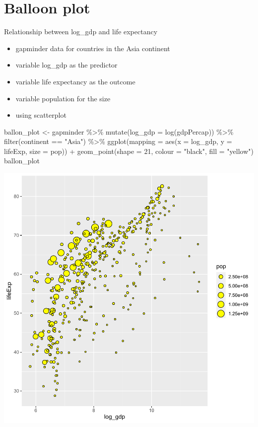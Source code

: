 \documentclass[
]{book}
\makeatletter
\newenvironment{Shaded}{\begin{snugshade}}{\end{snugshade}}
\newcommand{\AttributeTok}[1]{\textcolor[rgb]{0.61,0.61,0.61}{#1}}
\newcommand{\DecValTok}[1]{\textcolor[rgb]{0.06,0.06,0.06}{#1}}
\newcommand{\FunctionTok}[1]{\textcolor[rgb]{0,0,0}{#1}}
\newcommand{\NormalTok}[1]{#1}
\newcommand{\OtherTok}[1]{\textcolor[rgb]{0.37,0.37,0.37}{#1}}
\newcommand{\SpecialCharTok}[1]{\textcolor[rgb]{0,0,0}{#1}}
\newcommand{\StringTok}[1]{\textcolor[rgb]{0.5,0.5,0.5}{#1}}
\providecommand{\tightlist}{%
  \setlength{\itemsep}{0pt}\setlength{\parskip}{0pt}}
\newenvironment{kframe}{%
\medskip{}
\setlength{\fboxsep}{.8em}
 \def\at@end@of@kframe{}%
 \ifinner\ifhmode%
  \def\at@end@of@kframe{\end{minipage}}%
  \begin{minipage}{\columnwidth}%
 \fi\fi%
 \def\FrameCommand##1{\hskip\@totalleftmargin \hskip-\fboxsep
 \colorbox{shadecolor}{##1}\hskip-\fboxsep
     \hskip-\linewidth \hskip-\@totalleftmargin \hskip\columnwidth}%
 \MakeFramed {\advance\hsize-\width
   \@totalleftmargin\z@ \linewidth\hsize
   \@setminipage}}%
 {\par\unskip\endMakeFramed%
 \at@end@of@kframe}
\renewenvironment{Shaded}{\begin{kframe}}{\end{kframe}}
\makeatother
\begin{document}
\hypertarget{balloon-plot}{%
\section{Balloon plot}\label{balloon-plot}}

Relationship between log\_gdp and life expectancy

\begin{itemize}
\tightlist
\item
  gapminder data for countries in the Asia continent
\item
  variable log\_gdp as the predictor
\item
  variable life expectancy as the outcome
\item
  variable population for the size
\item
  using scatterplot
\end{itemize}

\begin{Shaded}
\begin{Highlighting}[]
\NormalTok{ballon\_plot }\OtherTok{\textless{}{-}}\NormalTok{ gapminder }\SpecialCharTok{\%\textgreater{}\%} \FunctionTok{mutate}\NormalTok{(}\AttributeTok{log\_gdp =} \FunctionTok{log}\NormalTok{(gdpPercap)) }\SpecialCharTok{\%\textgreater{}\%}
  \FunctionTok{filter}\NormalTok{(continent }\SpecialCharTok{==} \StringTok{"Asia"}\NormalTok{) }\SpecialCharTok{\%\textgreater{}\%}
  \FunctionTok{ggplot}\NormalTok{(}\AttributeTok{mapping =} \FunctionTok{aes}\NormalTok{(}\AttributeTok{x =}\NormalTok{ log\_gdp, }\AttributeTok{y =}\NormalTok{ lifeExp, }\AttributeTok{size =}\NormalTok{ pop)) }\SpecialCharTok{+}
  \FunctionTok{geom\_point}\NormalTok{(}\AttributeTok{shape =} \DecValTok{21}\NormalTok{, }\AttributeTok{colour =} \StringTok{"black"}\NormalTok{, }\AttributeTok{fill =} \StringTok{"yellow"}\NormalTok{) }
\NormalTok{ballon\_plot}
\end{Highlighting}
\end{Shaded}

\begin{center}\includegraphics[width=0.7\linewidth,keepaspectratio]{Multivariable_Data_Analysis_files/figure-latex/unnamed-chunk-97-1} \end{center}
\end{document}
